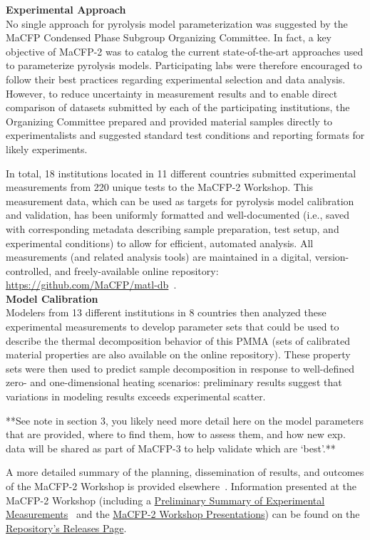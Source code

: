 \documentclass[12pt]{article}
\begin{document}
\textbf{Experimental Approach}\\
No single approach for pyrolysis model parameterization was suggested by the MaCFP Condensed Phase Subgroup Organizing Committee. In fact, a key objective of MaCFP-2 was to catalog the current state-of-the-art approaches used to parameterize pyrolysis models. Participating labs were therefore encouraged to follow their best practices regarding experimental selection and data analysis. However, to reduce uncertainty in measurement results and to enable direct comparison of datasets submitted by each of the participating institutions, the Organizing Committee prepared and provided material samples directly to experimentalists and suggested standard test conditions and reporting formats for likely experiments.  

In total, 18 institutions located in 11 different countries submitted experimental measurements from 220 unique tests to the MaCFP-2 Workshop. This measurement data, which can be used as targets for pyrolysis model calibration and validation, has been uniformly formatted and well-documented (i.e., saved with corresponding metadata describing sample preparation, test setup, and experimental conditions) to allow for efficient, automated analysis. All measurements (and related analysis tools) are maintained in a digital, version-controlled, and freely-available online repository: \url{https://github.com/MaCFP/matl-db}~\cite{MaCFP-cond-db}. \\

\textbf{Model Calibration}\\
Modelers from 13 different institutions in 8 countries then analyzed these experimental measurements to develop parameter sets that could be used to describe the thermal decomposition behavior of this PMMA (sets of calibrated material properties are also available on the online repository). These property sets were then used to predict sample decomposition in response to well-defined zero- and one-dimensional heating scenarios: preliminary results suggest that variations in modeling results exceeds experimental scatter. 

**See note in section 3, you likely need more detail here on the model parameters that are provided, where to find them, how to assess them, and how new exp. data will be shared as part of MaCFP-3 to help validate which are `best'.**


A more detailed summary of the planning, dissemination of results, and outcomes of the MaCFP-2 Workshop is provided elsewhere~\cite{Leventon2022ASTM}. Information presented at the MaCFP-2 Workshop (including a \href{https://github.com/MaCFP/matl-db/releases/tag/v1.0.0}{Preliminary Summary of Experimental Measurements}~\cite{PreliminarySummary} and the \href{https://github.com/MaCFP/matl-db/releases/tag/v1.1.0}{MaCFP-2 Workshop Presentations}) can be found on the 
\href{https://github.com/MaCFP/matl-db/releases}{Repository's Releases Page}.
\end{document}
